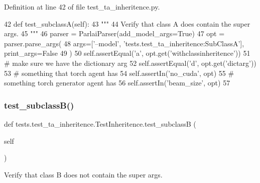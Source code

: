 Definition at line 42 of file test\+\_\+ta\+\_\+inheritence.\+py.


\begin{DoxyCode}
42     \textcolor{keyword}{def }test\_subclassA(self):
43         \textcolor{stringliteral}{"""}
44 \textcolor{stringliteral}{        Verify that class A does contain the super args.}
45 \textcolor{stringliteral}{        """}
46         parser = ParlaiParser(add\_model\_args=\textcolor{keyword}{True})
47         opt = parser.parse\_args(
48             args=[\textcolor{stringliteral}{'--model'}, \textcolor{stringliteral}{'tests.test\_ta\_inheritence:SubClassA'}], print\_args=\textcolor{keyword}{False}
49         )
50         self.assertEqual(\textcolor{stringliteral}{'a'}, opt.get(\textcolor{stringliteral}{'withclassinheritence'}))
51         \textcolor{comment}{# make sure we have the dictionary arg}
52         self.assertEqual(\textcolor{stringliteral}{'d'}, opt.get(\textcolor{stringliteral}{'dictarg'}))
53         \textcolor{comment}{# something that torch agent has}
54         self.assertIn(\textcolor{stringliteral}{'no\_cuda'}, opt)
55         \textcolor{comment}{# something torch generator agent has}
56         self.assertIn(\textcolor{stringliteral}{'beam\_size'}, opt)
57 
\end{DoxyCode}
\mbox{\label{classtests_1_1test__ta__inheritence_1_1TestInheritence_a3bed049c4393b8c6c8a9afbe550f7893}} 
\subsubsection{\texorpdfstring{test\+\_\+subclass\+B()}{test\_subclassB()}}
{\footnotesize\ttfamily def tests.\+test\+\_\+ta\+\_\+inheritence.\+Test\+Inheritence.\+test\+\_\+subclassB (\begin{DoxyParamCaption}\item[{}]{self }\end{DoxyParamCaption})}

\begin{DoxyVerb}Verify that class B does not contain the super args.
\end{DoxyVerb}
 

